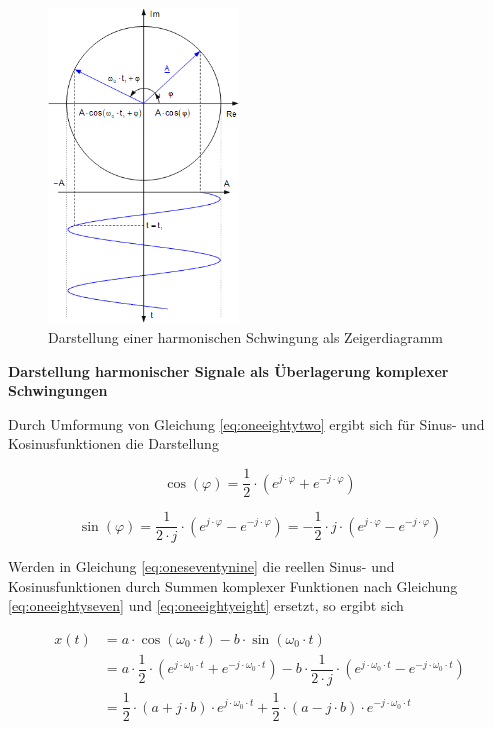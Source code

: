 \noindent 
\begin{figure}[H]
  \centerline{\includegraphics[width=0.45\textwidth]{Kapitel1/Bilder/image23}}
  \caption{Darstellung einer harmonischen Schwingung als Zeigerdiagramm }
  \label{fig:HarmonischeSchwingung}
\end{figure}

\medskip
{\selectfont
\noindent\textbf{Darstellung harmonischer Signale als Überlagerung komplexer Schwingungen}} \smallskip

\noindent Durch Umformung von Gleichung \ref{eq:oneeightytwo} ergibt sich f\"{u}r Sinus- und Kosinusfunktionen die Darstellung


\begin{equation}\label{eq:oneeightyseven}
\cos \left(\varphi \right)=\dfrac{1}{2} \cdot \left(e^{j\cdot \varphi } +e^{-j\cdot \varphi } \right)
\end{equation}

\begin{equation}\label{eq:oneeightyeight}
\sin \left(\varphi \right)=\dfrac{1}{2\cdot j} \cdot \left(e^{j\cdot \varphi } -e^{-j\cdot \varphi } \right)=-\dfrac{1}{2} \cdot j\cdot \left(e^{j\cdot \varphi } -e^{-j\cdot \varphi } \right)
\end{equation}


\noindent Werden in Gleichung \ref{eq:oneseventynine} die reellen Sinus- und Kosinusfunktionen durch Summen komplexer Funktionen nach Gleichung \ref{eq:oneeightyseven} und \ref{eq:oneeightyeight} ersetzt, so ergibt sich 

\begin{equation}\label{eq:oneeightynine}
\begin{split}
x(t) & = a\cdot \cos \left(\omega _{0} \cdot t\right)-b\cdot \sin \left(\omega _{0} \cdot t\right) \\ 
 & = a\cdot \dfrac{1}{2} \cdot \left(e^{j\cdot \omega _{0} \cdot t} +e^{-j\cdot \omega _{0} \cdot t} \right)-b\cdot \dfrac{1}{2\cdot j} \cdot \left(e^{j\cdot \omega _{0} \cdot t} -e^{-j\cdot \omega _{0} \cdot t} \right) \\ 
 & = \dfrac{1}{2} \cdot \left(a+j\cdot b\right)\cdot e^{j\cdot \omega _{0} \cdot t} +\dfrac{1}{2} \cdot \left(a-j\cdot b\right)\cdot e^{-j\cdot \omega _{0} \cdot t } 
\end{split}
\end{equation}


